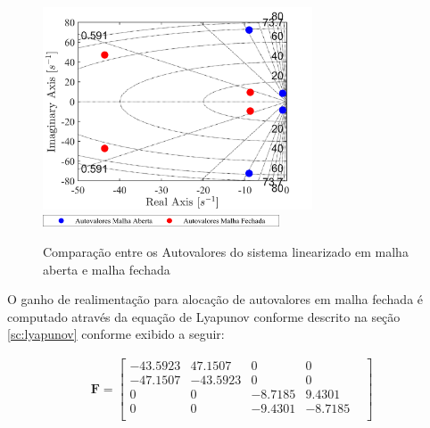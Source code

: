 \documentclass[a4paper]{ifacconf}
\begin{document}
    \FloatBarrier
    \begin{figure}[htbp]
        \begin{centering}
            \includegraphics[width=8cm]{img/autovalores_malha_fechada.png}
            \includegraphics[width=7cm]{img/autovalores_malha_fechada_leg.png}
            \caption{Comparação entre os Autovalores do sistema linearizado em malha aberta e malha fechada}
            \label{fig:autovalores_malha_fechada}
        \end{centering}
    \end{figure}
    \FloatBarrier
    
    O ganho de realimentação para alocação de autovalores em malha fechada é computado através da equação de Lyapunov conforme descrito na seção \ref{sc:lyapunov} conforme exibido a seguir:
    
    \begin{equation*} 
    \begin{split}
        \mathbf{F} =
        \begin{bmatrix}
            -43.5923 &  47.1507 &       0       & 0 & \\ 
            -47.1507 & -43.5923 &       0 &       0 & \\
                   0 &        0 & -8.7185 &  9.4301 & \\
                   0 &        0 & -9.4301 & -8.7185 & \\
        \end{bmatrix}
    \end{split}
    \end{equation*} 
 
\end{document}
